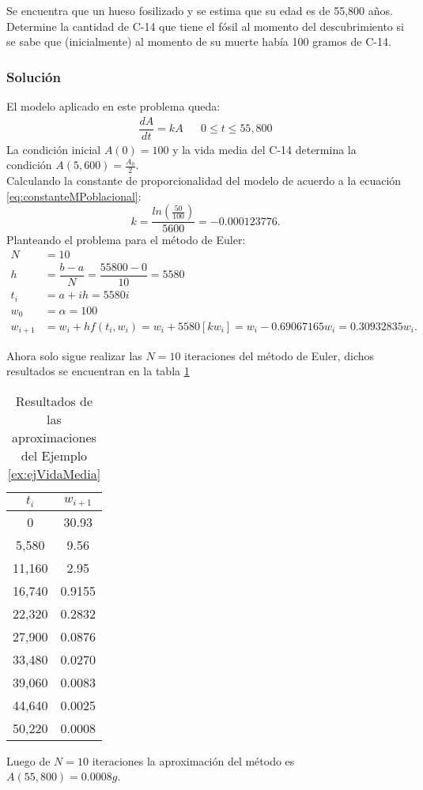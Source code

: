 \begin{exerciseT}{\rm Se encuentra que un hueso fosilizado y se estima que su edad es de 55,800 años. Determine la cantidad de C-14 que 
tiene el fósil al momento del descubrimiento si se sabe que (inicialmente) al momento de su muerte había 100 gramos de C-14.
	
	\subsubsection*{Solución}
	El modelo aplicado en este problema queda:
	\begin{align*}
	    \dfrac{dA}{dt} = kA && 0\leq t\leq 55,800
	\end{align*}
	La condición inicial $A(0)=100$ y la vida media del C-14 determina la condición $A(5,600)=\displaystyle{\frac{A_0}{2}}$.\\
	Calculando la constante de proporcionalidad del modelo de acuerdo a la ecuación \ref{eq:constanteMPoblacional}:	
	$$k=\frac{ln \left(\displaystyle{\frac{50}{100}} \right)}{5600} = -0.000123776.$$
	Planteando el problema para el método de Euler:
	\begin{align*}
	    N &= 10\\
	    h &= \dfrac{b-a}{N} = \dfrac{55800-0}{10} = 5580 \\
	    t_i &= a + ih = 5580i\\
        w_0 &= \alpha = 100\\
        w_{i+1} &= w_i + hf(t_i,w_i) = w_i + 5580[kw_i] = w_i-0.69067165w_i = 0.30932835w_i.
	\end{align*}
	
	Ahora solo sigue realizar las $N=10$ iteraciones del método de Euler, dichos resultados se encuentran en la tabla \ref{table:resEjVidaMedia}
	
	\begin{table}[H]
    	\centering
      	\begin{tabular}{c|c}
      		\toprule
      		$t_i$ & $w_{i+1}$\\
      		\midrule
			0 		& 30.93\\
			5,580   & 9.56\\
			11,160 	& 2.95\\
			16,740  & 0.9155\\
			22,320 	& 0.2832\\
			27,900  & 0.0876\\
			33,480  & 0.0270\\
			39,060  & 0.0083\\
			44,640	& 0.0025\\
			50,220  & 0.0008\\
			\bottomrule
      	\end{tabular}
      	\caption{Resultados de las aproximaciones del Ejemplo \ref{ex:ejVidaMedia}}
      	\label{table:resEjVidaMedia}
  	\end{table} 
	
	Luego de $N=10$ iteraciones la aproximación del método es $A(55,800) = 0.0008g$.
	\label{ex:ejVidaMedia}
}\end{exerciseT}

